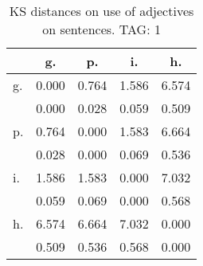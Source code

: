 \begin{table}[h!]
\begin{center}
\begin{tabular}{| l | c | c | c | c |}\hline
 & g. & p. & i. & h. \\\hline
g. & 0.000  & 0.764  & 1.586  & 6.574 \\\hline
 & 0.000  & 0.028  & 0.059  & 0.509 \\\hline
p. & 0.764  & 0.000  & 1.583  & 6.664 \\\hline
 & 0.028  & 0.000  & 0.069  & 0.536 \\\hline
i. & 1.586  & 1.583  & 0.000  & 7.032 \\\hline
 & 0.059  & 0.069  & 0.000  & 0.568 \\\hline
h. & 6.574  & 6.664  & 7.032  & 0.000 \\\hline
 & 0.509  & 0.536  & 0.568  & 0.000 \\\hline
\end{tabular}
\caption{KS distances on use of adjectives on sentences. TAG: 1}
\end{center}
\end{table}